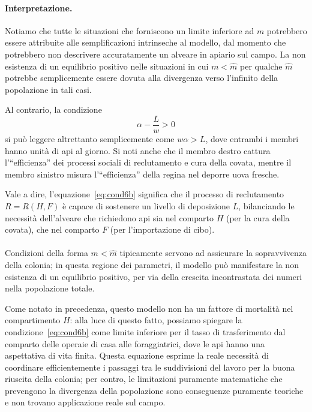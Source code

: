 \paragraph{Interpretazione.}
\label{par:interpretationCond6b}
Notiamo che tutte le situazioni che forniscono un limite inferiore ad $m$ potrebbero essere attribuite alle
semplificazioni intrinseche al modello, dal momento che potrebbero non descrivere accuratamente un alveare
in apiario sul campo. La non esistenza di un equilibrio positivo nelle situazioni in cui
$m< \hat{m}$ per qualche $\hat{m}$ potrebbe semplicemente essere dovuta alla divergenza verso l'infinito
della popolazione in tali casi.

Al contrario, la condizione
\begin{equation}
\alpha - \frac{L}{w} > 0
    \label{eq:cond6b}
\end{equation}
si può leggere altrettanto semplicemente come $w \alpha >L$, dove entrambi i membri hanno unità di api al giorno.
Si noti anche che il membro destro cattura l'``efficienza'' dei processi sociali di reclutamento e cura della
covata, mentre il membro sinistro misura l'``efficienza'' della regina nel deporre uova fresche.

Vale a dire, l'equazione~\eqref{eq:cond6b} significa che il processo di reclutamento $R= R(H, F)$ è capace
di sostenere un livello di deposizione $L$, bilanciando le necessità dell'alveare che richiedono api sia nel
comparto $H$ (per la cura della covata), che nel comparto $F$ (per l'importazione di cibo).

\paragraph{}
Condizioni della forma $m< \hat{m}$ tipicamente servono ad assicurare la sopravvivenza della colonia;
in questa regione dei parametri, il modello può manifestare la non esistenza di un equilibrio positivo,
per via della crescita incontrastata dei numeri nella popolazione totale.

Come notato in precedenza, questo modello non ha un fattore di mortalità nel compartimento $H$: alla luce
di questo fatto, possiamo spiegare la condizione~\eqref{eq:cond6b} come limite inferiore per il tasso
di trasferimento dal comparto delle operaie di casa alle foraggiatrici, dove le api hanno una aspettativa
di vita finita.
Questa equazione esprime la reale necessità di coordinare efficientemente i passaggi tra le suddivisioni
del lavoro per la buona riuscita della colonia; per contro, le limitazioni puramente matematiche che
prevengono la divergenza della popolazione sono conseguenze puramente teoriche e non trovano applicazione
reale sul campo.

